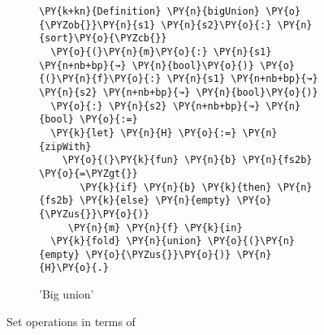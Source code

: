 \begin{figure}
\begin{subfigure}{0.5\textwidth}
\begin{Verbatim}[commandchars=\\\{\}]
\PY{k+kn}{Definition} \PY{n}{bigUnion} \PY{o}{\PYZob{}}\PY{n}{s1} \PY{n}{s2}\PY{o}{:} \PY{n}{sort}\PY{o}{\PYZcb{}}
  \PY{o}{(}\PY{n}{m}\PY{o}{:} \PY{n}{s1} \PY{n+nb+bp}{↝} \PY{n}{bool}\PY{o}{)} \PY{o}{(}\PY{n}{f}\PY{o}{:} \PY{n}{s1} \PY{n+nb+bp}{↝} \PY{n}{s2} \PY{n+nb+bp}{↝} \PY{n}{bool}\PY{o}{)}
  \PY{o}{:} \PY{n}{s2} \PY{n+nb+bp}{↝} \PY{n}{bool} \PY{o}{:=}
  \PY{k}{let} \PY{n}{H} \PY{o}{:=} \PY{n}{zipWith}
    \PY{o}{(}\PY{k}{fun} \PY{n}{b} \PY{n}{fs2b} \PY{o}{=\PYZgt{}}
       \PY{k}{if} \PY{n}{b} \PY{k}{then} \PY{n}{fs2b} \PY{k}{else} \PY{n}{empty} \PY{o}{\PYZus{}}\PY{o}{)}
     \PY{n}{m} \PY{n}{f} \PY{k}{in}
  \PY{k}{fold} \PY{n}{union} \PY{o}{(}\PY{n}{empty} \PY{o}{\PYZus{}}\PY{o}{)} \PY{n}{H}\PY{o}{.}
\end{Verbatim}
  \caption{'Big union'}
  \label{code:bigUnion}
\end{subfigure}
  \caption{Set operations in terms of }
  \label{code:vec-ops}
\end{figure}
